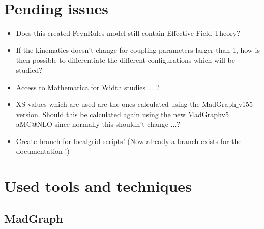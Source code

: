 \documentclass[a4paper,12pt]{report}
\date{Started 4 April 2014}
\begin{document}
\setcounter{secnumdepth}{3} %
\setcounter{tocdepth}{2}    %

\maketitle
\tableofcontents
\newpage

\chapter{Pending issues}
\begin{itemize}
  \item Does this created FeynRules model still contain Effective Field Theory?
  \item If the kinematics doesn't change for coupling parameters larger than 1, how is then possible to differentiate the different configurations which will be studied?
  \item Access to Mathematica for Width studies ... ?
  \item XS values which are used are the ones calculated using the MadGraph$\_$v155 version. Should this be calculated again using the new MadGraphv5$\_$aMC@NLO since normally this shouldn't change ...?
  \item Create branch for localgrid scripts! (Now already a branch exists for the documentation !)
\end{itemize}

\chapter{Used tools and techniques}

\section{MadGraph}
\end{document}

